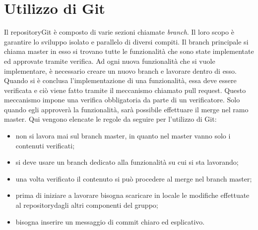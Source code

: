\section{Utilizzo di Git}
Il repository\glosp Git è composto di varie sezioni chiamate \textit{branch}. Il loro scopo è garantire lo sviluppo isolato e parallelo di diversi compiti. Il branch principale si chiama master in esso si trovano tutte le funzionalità che sono state implementate ed approvate tramite verifica. Ad ogni nuova funzionalità che si vuole implementare, è necessario creare un nuovo branch e lavorare dentro di esso. Quando si è conclusa l'implementazione di una funzionalità, essa deve essere verificata e ciò viene fatto tramite il meccanismo chiamato pull request. Questo meccanismo impone una verifica obbligatoria da parte di un verificatore. Solo quando egli approverà la funzionalità, sarà possibile effettuare il merge nel ramo master.
Qui vengono elencate le regole da seguire per l'utilizzo di Git:
\begin{itemize}
	\item non si lavora mai sul branch master, in quanto nel master vanno solo i contenuti verificati;
	\item si deve usare un branch dedicato alla funzionalità su cui si sta lavorando;
	\item una volta verificato il contenuto si può procedere al merge nel branch master;
	\item prima di iniziare a lavorare bisogna scaricare in locale le modifiche effettuate al repository\glosp dagli altri componenti del gruppo;
	\item bisogna inserire un messaggio di commit chiaro ed esplicativo.
\end{itemize}